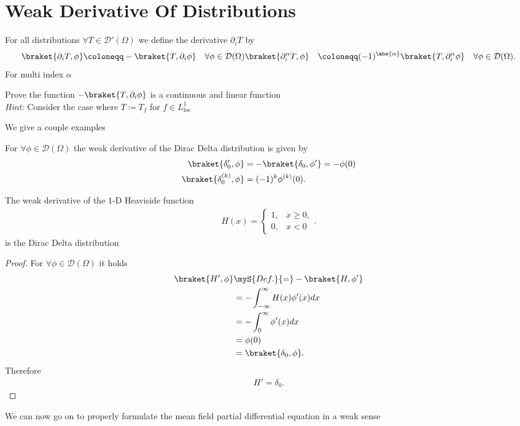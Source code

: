 \section{Weak Derivative Of Distributions}
\begin{definition}
 For all distributions  $\forall  T \in  \mathcal{D}'(\Omega )$  we define the derivative $\partial_i T$ by 
 \begin{align*}
   \braket{\partial_i T,\phi } &\coloneqq -\braket{T,\partial_i \phi } \quad \forall \phi  \in \mathcal{D}(\Omega)
   \braket{\partial_i^{\alpha }  T,\phi } &\coloneqq (-1)^{\abs{\alpha }} \braket{T,\partial_i^{\alpha }  \phi } \quad \forall \phi  \in \mathcal{D}(\Omega)
 .\end{align*}
 For multi index $\alpha $ 
\end{definition}
\begin{exercise}
  Prove the function $-\braket{T,\partial_i \phi }$  is a continuous and linear function  \\[1ex]
  \textit{Hint:} Consider the case where $T \coloneqq T_f$ for $f \in  L_{\text{loc}}^{1} $
\end{exercise}
We give a couple examples 
\begin{example}
 For  $\forall \phi  \in  \mathcal{D}(\Omega )$ the weak derivative of the Dirac Delta distribution is given by 
 \begin{align*}
   \braket{\delta'_0,\phi } &= - \braket{\delta_0,\phi'} = -\phi(0)\\
   \braket{\delta_0^{(k)},\phi  } &= (-1)^{k} \phi ^{(k)}  (0)
 .\end{align*}
\end{example}
\begin{lemma}
 The weak derivative of the $1$-D Heaviside function 
 \begin{align*}
  H(x) = \begin{cases}
    1, &x\ge 0,\\
    0,&x<0
  \end{cases}
 .\end{align*}
 is the Dirac Delta distribution
\end{lemma}
\begin{proof}
 For $\forall  \phi  \in \mathcal{D}(\Omega )$  it holds 
 \begin{align*}
   \braket{H',\phi } &\myS{Def.}{=} -\braket{H,\phi'}\\
                     &= - \int_{-\infty}^{\infty} H(x)\phi'(x)  dx \\
                     &= - \int_0^{\infty} \phi'(x) dx \\
                     &= \phi(0) \\
                     &= \braket{\delta_0,\phi }
 .\end{align*}
 Therefore 
 \begin{align*}
  H' = \delta_0
 .\end{align*}
\end{proof}
We can now go on to properly formulate the mean field partial differential equation in a weak sense
